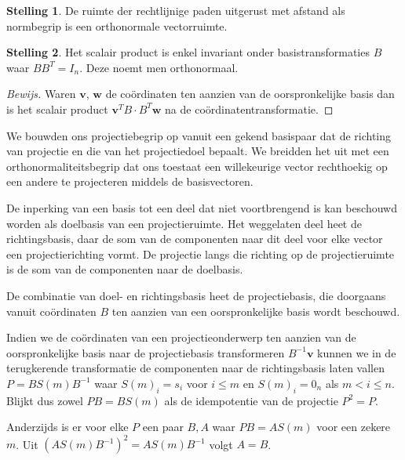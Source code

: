 \documentclass{amsart}
\theoremstyle{definition}
\newtheorem{thm}{Stelling}[section]
\newenvironment{bewijs}{\begin{proof}[Bewijs]}{\end{proof}}
\newcommand{\vvec}[1][v]{\mathbf{#1}}
\begin{document}
\begin{thm}
    De ruimte der rechtlijnige paden uitgerust met afstand als normbegrip is een orthonormale vectorruimte.
\end{thm}

\begin{thm}
    Het scalair product is enkel invariant onder basistransformaties $B$ waar $BB^T=I_n$. Deze noemt men orthonormaal.
    \begin{bewijs}
        Waren $\vvec$, $\vvec[w]$ de coördinaten ten aanzien van de oorspronkelijke basis dan is het scalair product $\vvec^T B\cdot B^T\vvec[w]$ na de coördinatentransformatie.
    \end{bewijs}
\end{thm}

We bouwden ons projectiebegrip op vanuit een gekend basispaar dat de richting van projectie en die van het projectiedoel bepaalt.
We breidden het uit met een orthonormaliteitsbegrip dat ons toestaat een willekeurige vector rechthoekig op een andere te projecteren middels de basisvectoren.

De inperking van een basis tot een deel dat niet voortbrengend is kan beschouwd worden als doelbasis van een projectieruimte.
Het weggelaten deel heet de richtingsbasis, daar de som van de componenten naar dit deel voor elke vector een projectierichting vormt.
De projectie langs die richting op de projectieruimte is de som van de componenten naar de doelbasis.

De combinatie van doel- en richtingsbasis heet de projectiebasis, die doorgaans vanuit coördinaten $B$ ten aanzien van een oorspronkelijke basis wordt beschouwd.

Indien we de coördinaten van een projectieonderwerp ten aanzien van de oorspronkelijke basis naar de projectiebasis transformeren $B^{-1}\vvec$ kunnen we in de terugkerende transformatie de componenten naar de richtingsbasis laten vallen $P = BS(m)B^{-1}$ waar $S(m)_i = s_i$ voor $i\leq m$ en $S(m)_i = 0_n$ als $m<i\leq n$.
Blijkt dus zowel $PB = BS(m)$ als de idempotentie van de projectie $P^2=P$.

Anderzijds is er voor elke $P$ een paar $B, A$ waar $PB = AS(m)$ voor een zekere $m$. Uit ${(AS(m)B^{-1})}^2 = AS(m)B^{-1}$ volgt $A = B$.

\newpage
\end{document}

